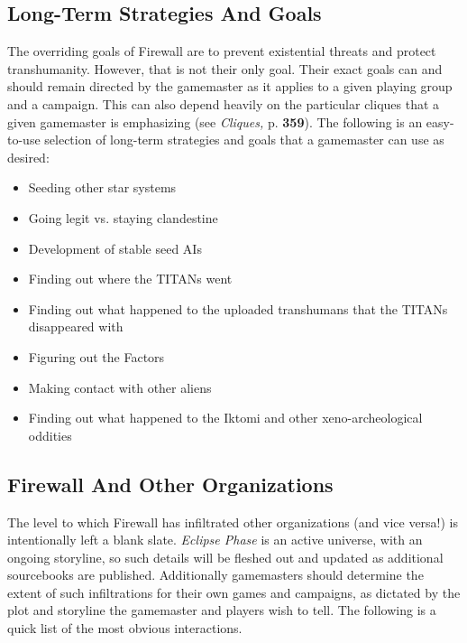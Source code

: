 \subsection{Long-Term Strategies And Goals } 

The overriding goals of Firewall are to prevent existential threats and protect transhumanity. However, that is not their only goal. Their exact goals can and should remain directed by the gamemaster as it applies to a given playing group and a campaign. This can also depend heavily on the particular cliques that a given gamemaster is emphasizing (see \textit{Cliques,} p. \textbf{359}). The following is an easy-to-use selection of long-term strategies and goals that a gamemaster can use as desired: 

\begin{itemize} \item Seeding other star systems \item Going legit vs. staying clandestine \item Development of stable seed AIs \item Finding out where the TITANs went \item Finding out what happened to the uploaded transhumans that the TITANs disappeared with \item Figuring out the Factors \item Making contact with other aliens \item Finding out what happened to the Iktomi and other xeno-archeological oddities \end{itemize} 



\subsection{Firewall And Other Organizations } 

The level to which Firewall has infiltrated other organizations (and vice versa!) is intentionally left a blank slate. \textit{Eclipse Phase }is an active universe, with an ongoing storyline, so such details will be fleshed out and updated as additional sourcebooks are published. Additionally gamemasters should determine the extent of such infiltrations for their own games and campaigns, as dictated by the plot and storyline the gamemaster and players wish to tell. The following is a quick list of the most obvious interactions. 

